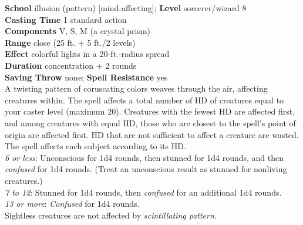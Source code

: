 \textbf{School} illusion (pattern) [mind-affecting]; \textbf{Level} sorcerer/wizard 8\\
\textbf{Casting Time} 1 standard action\\
\textbf{Components} V, S, M (a crystal prism)\\
\textbf{Range} close (25 ft. + 5 ft./2 levels)\\
\textbf{Effect} colorful lights in a 20-ft.-radius spread\\
\textbf{Duration} concentration + 2 rounds\\
\textbf{Saving Throw} none; \textbf{Spell Resistance} yes\\
A twisting pattern of coruscating colors weaves through the air, affecting creatures within. The spell affects a total number of HD of creatures equal to your caster level (maximum 20). Creatures with the fewest HD are affected first, and among creatures with equal HD, those who are closest to the spell's point of origin are affected first. HD that are not sufficient to affect a creature are wasted. The spell affects each subject according to its HD.\\
\textit{6 or less}: Unconscious for 1d4 rounds, then stunned for 1d4 rounds, and then \textit{confused }for 1d4 rounds. (Treat an unconscious result as stunned for nonliving creatures.)\\
\textit{7 to 12}: Stunned for 1d4 rounds, then \textit{confused }for an additional 1d4 rounds. \\
\textit{13 or more}:\textit{ Confused }for 1d4 rounds. \\
Sightless creatures are not affected by \textit{scintillating pattern}.\\
